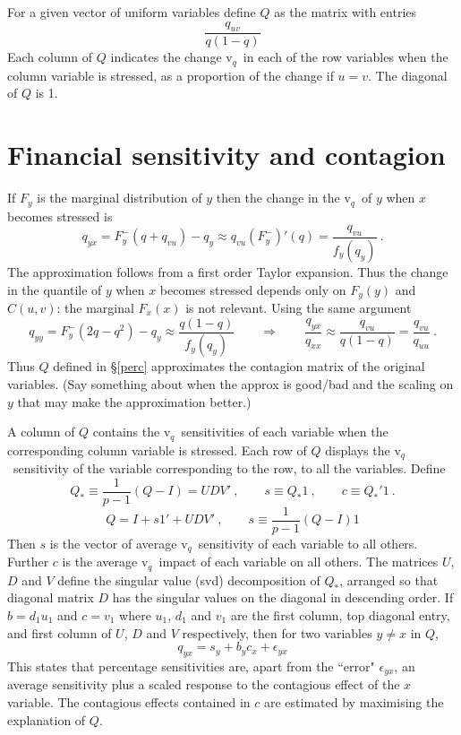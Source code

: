 \documentclass[authoryear]{elsarticle}
\newcommand{\eps}{\epsilon}
\renewcommand{\v}{\ensuremath{\mathrm{v}_q}}
\newcommand{\sref}[1]{\S\ref{#1}}
\newcommand{\cq}{\ , \qquad}
\begin{document}
For a given vector of uniform variables define $Q$ as the matrix with entries 
$$
\frac{q_{uv}}{q(1-q)}
$$   
Each column of $Q$ indicates the change \v\ in each of the row variables when the column variable  is stressed, as a proportion of the change if $u=v$.  The diagonal of $Q$ is 1. 

\section{Financial sensitivity and contagion}
 
 If $F_y$ is the marginal distribution of $y$ then the change in the \v\ of $y$ when $x$ becomes stressed is
 $$
 q_{yx}= F_y^-(q+q_{vu}) - q_y \approx q_{vu}(F_y^-)'(q) = \frac{q_{vu}}{f_y(q_y)} \ .
 $$
The approximation follows from a first order Taylor expansion.    Thus the change in the quantile of $y$ when $x$ becomes stressed depends only on  $F_y(y)$ and $C(u,v)$:  the marginal $F_x(x)$ is not relevant.  Using the same argument
 $$
 q_{yy}=  F_y^-(2q-q^2) - q_y\approx \frac{q(1-q)}{f_y(q_y)}
 \qquad\Rightarrow\qquad
 \frac{q_{yx}}{q_{xx}} \approx  \frac{q_{vu}}{q(1-q)}=\frac{q_{vu}}{q_{uu}}\ .
 $$
 Thus $Q$  defined in \sref{perc} approximates the contagion matrix of the original variables.
(Say something about when the approx is good/bad and the scaling on $y$ that may make the approximation better.)

A column of $Q$ contains the \v\ sensitivities of each variable when the  corresponding column variable is stressed.   Each row of $Q$ displays the \v\ sensitivity of the variable corresponding to the row, to all the variables.  Define
$$
Q_* \equiv \frac{1}{p-1}(Q-I)=UDV'\cq s\equiv Q_*1\cq c\equiv Q_*'1\ .
$$$$
Q=I + s1'+ UDV'\cq s\equiv \frac{1}{p-1}(Q-I)1
$$
Then $s$ is the vector of average \v\ sensitivity of each variable to all others.  Further $c$ is the average \v\ impact of each variable on all others.   The matrices $U$, $D$ and $V$ define the singular value (svd) decomposition of $Q_*$, arranged so that diagonal matrix $D$ has the singular values on  the diagonal in descending order.   If $b=d_1u_1$ and $c=v_1$ where $u_1$, $d_1$ and $v_1$ are the first column, top diagonal entry, and first column of $U$, $D$ and $V$ respectively, then  for two variables $y\ne x$ in $Q$,
$$
q_{yx} = s_y+ b_yc_x +\eps_{yx}
$$
This states that percentage sensitivities are, apart from the ``error" $\eps_{yx}$, an average sensitivity plus a scaled response to the contagious effect of the $x$ variable.   The contagious effects contained in $c$ are estimated by maximising the explanation of $Q$.
\end{document}
